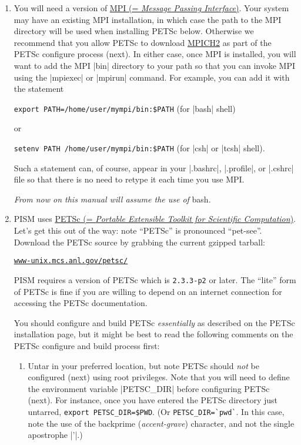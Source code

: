 \documentclass[11pt,final]{amsart}
\newcommand{\PETSCREL}{2.3.3-p2}
\renewcommand{\t}[1]{\texttt{#1}}
\newcommand{\und}{\_\!\_}
\begin{document}
\begin{enumerate}
\item You will need a version of \href{http://www-unix.mcs.anl.gov/mpi/}{MPI (= \emph{Message Passing Interface})}. Your system may have an existing MPI installation, in which case the path to the MPI
  directory will be used when installing PETSc below. Otherwise we recommend that you allow PETSc to download
  \href{http://www-unix.mcs.anl.gov/mpi/mpich2/}{MPICH2} as part of the PETSc configure process (next). In either case, once MPI
  is installed, you will want to add the MPI |bin| directory to your path so that you can invoke MPI using the |mpiexec|
  or |mpirun| command. For example, you can add it with the statement

\verb|export PATH=/home/user/mympi/bin:$PATH|  \qquad (for |bash| shell)

\noindent or

\verb|setenv PATH /home/user/mympi/bin:$PATH|  \qquad (for |csh| or |tcsh| shell).

\noindent Such a statement can, of course, appear in your |.bashrc|, |.profile|, or |.cshrc| file so that there is
no need to retype it each time you use MPI.

\medskip
\begin{center}
  \emph{From now on this manual will assume the use of} bash.
\end{center}
\medskip

\item PISM uses \href{http://www-unix.mcs.anl.gov/petsc/}{PETSc (= \emph{Portable Extensible Toolkit for
 Scientific Computation})}.  Let's get this out of the way: note ``PETSc'' is pronounced ``pet-see''.  Download the PETSc source by grabbing the current gzipped tarball:
\begin{center}
    \href{http://www-unix.mcs.anl.gov/petsc/}{\t{www-unix.mcs.anl.gov/petsc/}}
\end{center}
PISM requires a version of PETSc which is \texttt{\PETSCREL} or later.  The ``lite'' form of PETSc is fine if you are willing to depend on an internet connection for accessing the PETSc documentation.

You should configure and build PETSc \emph{essentially} as described on the PETSc installation page, but it might be best to read the following comments on the PETSc configure and build process first:

\renewcommand{\labelenumii}{(\roman{enumii})}\begin{enumerate}
\item Untar in your preferred location, but note PETSc should \emph{not} be configured (next) using root privileges.  Note that you will need to define the environment variable |PETSC_DIR|\index{PETSC\und DIR} before configuring PETSc (next).  For instance, once you have entered the PETSc directory just untarred, \verb|export PETSC_DIR=$PWD|. (Or \verb|PETSC_DIR=`pwd`|.  In this case, note the use of the backprime (\emph{accent-grave}) character, and not the single apostrophe |'|.)


\end{enumerate}
\end{enumerate}
\end{document}
